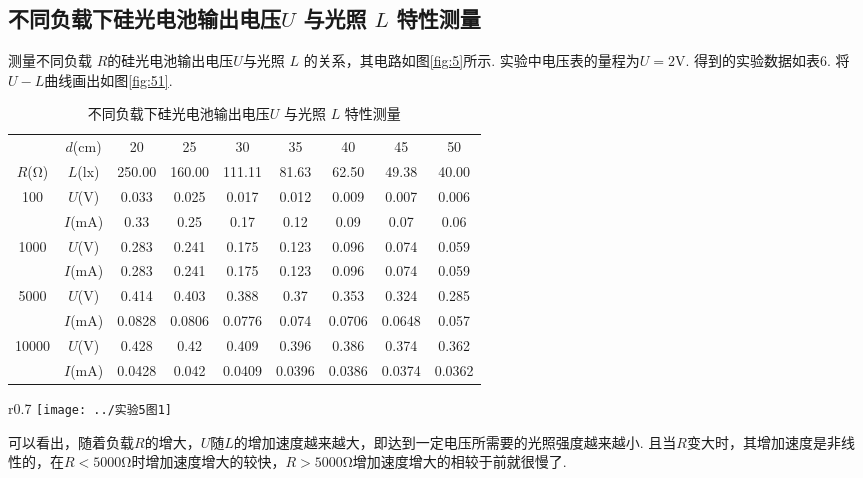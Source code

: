 \documentclass[11pt]{article}
\begin{document}
\subsection{不同负载下硅光电池输出电压$ U $ 与光照 $ L $ 特性测量}
测量不同负载 $ R $的硅光电池输出电压$ U  $与光照 $ L $ 的关系，其电路如图\ref{fig:5}所示. 实验中电压表的量程为$ U=2 $V. 得到的实验数据如表6. 将$ U-L $曲线画出如图\ref{fig:51}.

\begin{table}[htbp]\small
	\centering
	\caption{不同负载下硅光电池输出电压$ U $ 与光照 $ L $ 特性测量}
	\begin{tabular}{ccccccccc}
		\toprule
		& $ d $(cm) & 20     & 25     & 30     & 35     & 40     & 45     & 50     \\
		$ R $(Ω)                   & $ L $(lx) & 250.00 & 160.00 & 111.11 & 81.63  & 62.50  & 49.38  & 40.00  \\
		\midrule
		\multirow{2}{*}{100}   & $ U $(V)  & 0.033  & 0.025  & 0.017  & 0.012  & 0.009  & 0.007  & 0.006  \\
		& $ I $(mA) & 0.33   & 0.25   & 0.17   & 0.12   & 0.09   & 0.07   & 0.06   \\
		\midrule
		\multirow{2}{*}{1000}  & $ U $(V)  & 0.283  & 0.241  & 0.175  & 0.123  & 0.096  & 0.074  & 0.059  \\
		& $ I $(mA) & 0.283  & 0.241  & 0.175  & 0.123  & 0.096  & 0.074  & 0.059  \\
		\midrule
		\multirow{2}{*}{5000}  & $ U $(V)  & 0.414  & 0.403  & 0.388  & 0.37   & 0.353  & 0.324  & 0.285  \\
		& $ I $(mA) & 0.0828 & 0.0806 & 0.0776 & 0.074  & 0.0706 & 0.0648 & 0.057  \\
		\midrule
		\multirow{2}{*}{10000} & $ U $(V)  & 0.428  & 0.42   & 0.409  & 0.396  & 0.386  & 0.374  & 0.362  \\
		& $ I $(mA) & 0.0428 & 0.042  & 0.0409 & 0.0396 & 0.0386 & 0.0374 & 0.0362 \\
		\bottomrule
	\end{tabular}
\end{table}
\begin{wrapfigure}{r}{0.7\linewidth}
	\centering
	\texttt{[image: ../实验5图1]}
	\caption{不同负载下硅光电池的$ U-L $曲线}
	\label{fig:51}
\end{wrapfigure}

可以看出，随着负载$ R $的增大，$ U $随$L$的增加速度越来越大，即达到一定电压所需要的光照强度越来越小. 且当$ R $变大时，其增加速度是非线性的，在$ R<5000 $Ω时增加速度增大的较快，$ R>5000 $Ω增加速度增大的相较于前就很慢了.
\end{document}
